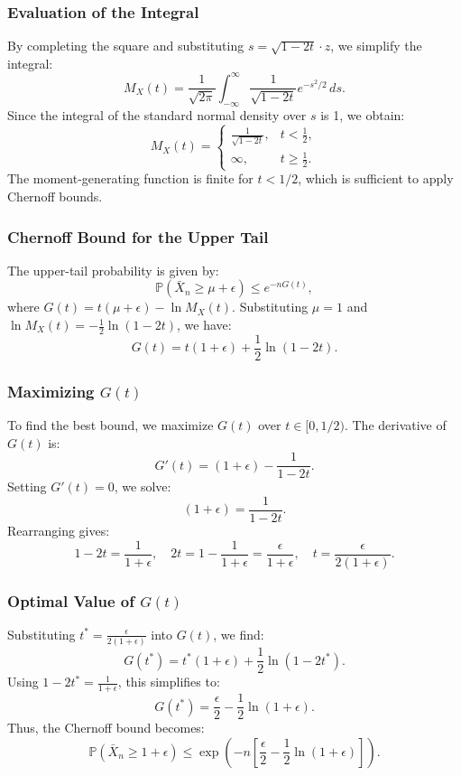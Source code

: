 \subsubsection{Evaluation of the Integral}

By completing the square and substituting \( s = \sqrt{1 - 2t} \cdot z \), we simplify the integral:
\[
M_X(t) = \frac{1}{\sqrt{2\pi}} \int_{-\infty}^\infty \frac{1}{\sqrt{1 - 2t}} e^{-s^2 / 2} \, ds.
\]
Since the integral of the standard normal density over \( s \) is 1, we obtain:
\[
M_X(t) =
\begin{cases}
\frac{1}{\sqrt{1 - 2t}}, & t < \frac{1}{2}, \\
\infty, & t \geq \frac{1}{2}.
\end{cases}
\]
The moment-generating function is finite for \( t < 1/2 \), which is sufficient to apply Chernoff bounds.

\subsubsection{Chernoff Bound for the Upper Tail}

The upper-tail probability is given by:
\[
\mathbb{P}\left(\bar{X}_n \geq \mu + \epsilon\right) \leq e^{-n G(t)},
\]
where \( G(t) = t (\mu + \epsilon) - \ln M_X(t) \). Substituting \( \mu = 1 \) and \( \ln M_X(t) = -\frac{1}{2} \ln(1 - 2t) \), we have:
\[
G(t) = t (1 + \epsilon) + \frac{1}{2} \ln(1 - 2t).
\]

\subsubsection{Maximizing \( G(t) \)}

To find the best bound, we maximize \( G(t) \) over \( t \in [0, 1/2) \). The derivative of \( G(t) \) is:
\[
G'(t) = (1 + \epsilon) - \frac{1}{1 - 2t}.
\]
Setting \( G'(t) = 0 \), we solve:
\[
(1 + \epsilon) = \frac{1}{1 - 2t}.
\]
Rearranging gives:
\[
1 - 2t = \frac{1}{1 + \epsilon}, \quad 2t = 1 - \frac{1}{1 + \epsilon} = \frac{\epsilon}{1 + \epsilon}, \quad t = \frac{\epsilon}{2(1 + \epsilon)}.
\]

\subsubsection{Optimal Value of \( G(t) \)}

Substituting \( t^* = \frac{\epsilon}{2(1 + \epsilon)} \) into \( G(t) \), we find:
\[
G(t^*) = t^* (1 + \epsilon) + \frac{1}{2} \ln\left(1 - 2t^*\right).
\]
Using \( 1 - 2t^* = \frac{1}{1 + \epsilon} \), this simplifies to:
\[
G(t^*) = \frac{\epsilon}{2} - \frac{1}{2} \ln(1 + \epsilon).
\]
Thus, the Chernoff bound becomes:
\[
\mathbb{P}\left(\bar{X}_n \geq 1 + \epsilon\right) \leq \exp\left(-n \left[\frac{\epsilon}{2} - \frac{1}{2} \ln(1 + \epsilon)\right]\right).
\]

